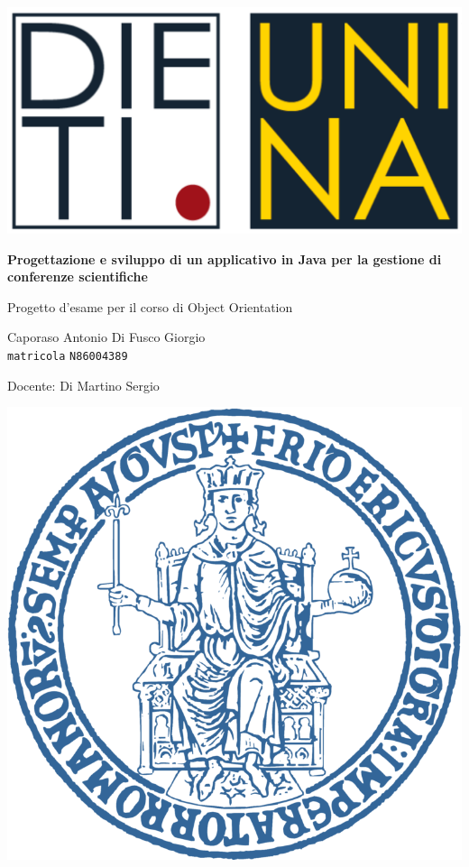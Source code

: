 \documentclass[a4paper, oneside, 12pt]{book}
\begin{document}
\begin{titlepage}
\begin{center}

\includegraphics[scale=0.6]{Immagini/logo_dieti.png}
\vspace*{1cm}

{\Huge{\textbf{Progettazione e sviluppo di un applicativo in Java per la gestione di conferenze scientifiche}}}

\vspace{1cm}

{\Large Progetto d'esame per il corso di Object Orientation}


\vfill

{\Large Caporaso Antonio} \qquad \Large{Di Fusco Giorgio}\\
\texttt{matricola} \qquad \texttt{N86004389}

\vspace{1cm}
Docente: Di Martino Sergio

\vspace{1cm}

\includegraphics[scale=0.6]{Immagini/LogoUnina.png}



\end{center}
\end{titlepage}
\end{document}
